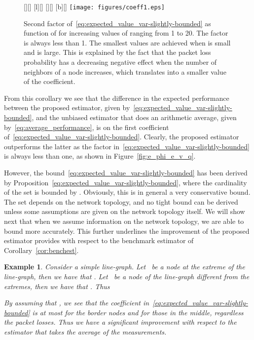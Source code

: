 \documentclass[a4paper,notitlepage,onecolumn]{article}
\newtheorem{example}[theorem]{Example}
\numberwithin{equation}{section}
\begin{document}
\begin{figure}
    \centering
    [][]{}
    [l][]{}
    [][]{}
    [b][]{}
    \texttt{[image: figures/coeff1.eps]}
    \caption{Second factor of~\eqref{eq:expected_value_var-slightly-bounded} as function of  for increasing values of 
    ranging from 1 to 20. The factor is always less than 1. The smallest values are achieved when
     is small and  is large. This is explained by the fact that the packet loss probability has a decreasing negative effect
    when the number of neighbors of a node increases, which translates into a smaller value of the coefficient.}\label{fig:coeff1}
\end{figure}


From this corollary we see that the difference in the expected
performance between the proposed estimator, given
by~\eqref{eq:expected_value_var-slightly-bounded}, and the
unbiased estimator that does an arithmetic average, given
by~\eqref{eq:average_performance}, is on the first coefficient
of~\eqref{eq:expected_value_var-slightly-bounded}. Clearly, the
proposed estimator outperforms the latter as the factor in~\eqref{eq:expected_value_var-slightly-bounded} is always
less than one, as shown in Figure~\ref{fig:e_phi_e_v_q}.

However, the bound~\eqref{eq:expected_value_var-slightly-bounded}
has been derived by
Proposition~\ref{eq:expected_value_var-slightly-bounded}, where
the cardinality of the set  is bounded by
. Obviously, this is in general a very conservative bound. The
set  depends on the network topology, and no
tight bound can be derived unless some assumptions are given on
the network topology itself. We will show next that when we assume
information on the network topology, we are able to bound
 more accurately. This further underlines
the improvement of the proposed estimator provides with respect to
the benchmark estimator of Corollary~\ref{cor:benchest}.

\begin{example}
Consider a simple line-graph. Let~ be a node at the extreme of
the line-graph, then we have that .
Let~ be a node of the line-graph different from the extremes,
then we have that . Thus

By assuming that , we see that the
coefficient in~\eqref{eq:expected_value_var-slightly-bounded} is
at most  for the border nodes and  for those in the
middle, regardless the packet losses. Thus we have a significant
improvement with respect to the estimator that takes the average
of the measurements.



\end{example}
\end{document}
